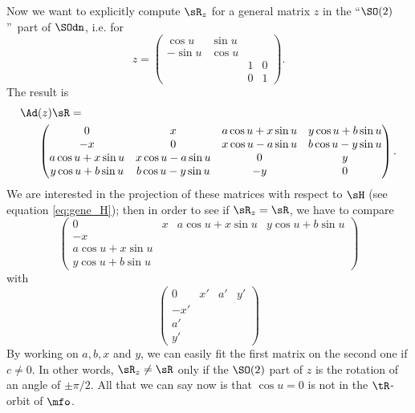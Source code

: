 Now we want to explicitly compute $\sR_z$ for a general matrix $z$ in the ``$\SO(2)$''\ part of $\SOdn$, i.e. for
\[
	z=
	\begin{pmatrix}
		\cos u  & \sin u         \\
		-\sin u & \cos u         \\
		        &        & 1 & 0 \\
		        &        & 0 & 1
	\end{pmatrix}.
\]
The result is
\begin{equation}
	\begin{split}
		\Ad&(z)\sR=\\
		&\begin{pmatrix}
			0               & x                & a\cos u+x\sin u & y\cos u+b\sin u \\
			-x              & 0                & x\cos u-a\sin u & b\cos u-y\sin u \\
			a\cos u+x\sin u & x\cos u -a\sin u & 0               & y               \\
			y\cos u+b\sin u & b\cos u-y\sin u  & -y              & 0
		\end{pmatrix}.
	\end{split}
\end{equation}
We are interested in the projection of these matrices with respect to $\sH$ (see equation \eqref{eq:gene_H}); then in order to see if $\sR_z=\sR$, we have to compare
\[
	\begin{pmatrix}
		0                & x & a\cos u+x\sin u & y\cos u+b\sin u \\
		-x               &   &                 &                 \\
		a\cos u+x\sin u  &   &                 &                 \\
		y \cos u+b\sin u &   &                 &
	\end{pmatrix}
\]
with
\[
	\begin{pmatrix}
		0   & x' & a' & y' \\
		-x' &    &    &    \\
		a'  &    &    &    \\
		y'  &    &    &
	\end{pmatrix}
\]
By working on $a,b,x$ and $y$, we can easily fit the first matrix on the second
one if $c\neq 0$. In other words, $\sR_z\neq\sR$ only if the $\SO(2)$
part of $z$ is the rotation of an angle of $\pm\pi/2$. All that we can say now is that $\cos u=0$ is  not in the $\tR$-orbit of $\mfo$.

